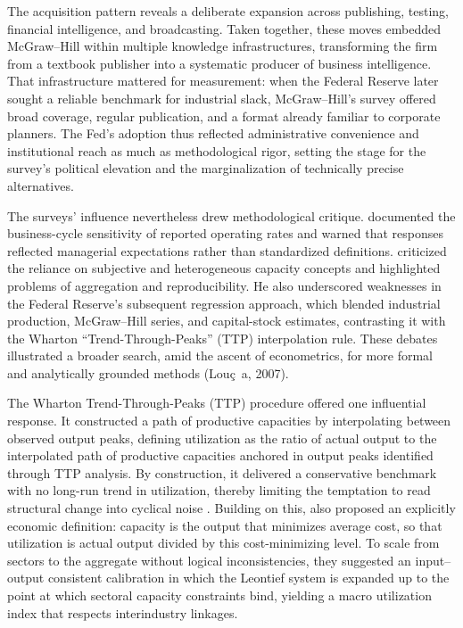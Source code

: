 \documentclass[11pt]{article}
\begin{document}
The acquisition pattern reveals a deliberate expansion across publishing, testing, financial intelligence, and broadcasting. Taken together, these moves embedded McGraw--Hill within multiple knowledge infrastructures, transforming the firm from a textbook publisher into a systematic producer of business intelligence. That infrastructure mattered for measurement: when the Federal Reserve later sought a reliable benchmark for industrial slack, McGraw--Hill's survey offered broad coverage, regular publication, and a format already familiar to corporate planners. The Fed's adoption thus reflected administrative convenience and institutional reach as much as methodological rigor, setting the stage for the survey's political elevation and the marginalization of technically precise alternatives.

The surveys' influence nevertheless drew methodological critique. \citet{butler1958} documented the business-cycle sensitivity of reported operating rates and warned that responses reflected managerial expectations rather than standardized definitions. \citet{phillips1963} criticized the reliance on subjective and heterogeneous capacity concepts and highlighted problems of aggregation and reproducibility. He also underscored weaknesses in the Federal Reserve's subsequent regression approach, which blended industrial production, McGraw--Hill series, and capital-stock estimates, contrasting it with the Wharton ``Trend-Through-Peaks'' (TTP) interpolation rule. These debates illustrated a broader search, amid the ascent of econometrics, for more formal and analytically grounded methods (Lou{\c{c}}{~a}, 2007).

The Wharton Trend-Through-Peaks (TTP) procedure offered one influential response. It constructed a path of productive capacities by interpolating between observed output peaks, defining utilization as the ratio of actual output to the interpolated path of productive capacities anchored in output peaks identified through TTP analysis. By construction, it delivered a conservative benchmark with no long-run trend in utilization, thereby limiting the temptation to read structural change into cyclical noise \citep{kleinsummers1967}. Building on this, \citet{kleindavid1958} also proposed an explicitly economic definition: capacity is the output that minimizes average cost, so that utilization is actual output divided by this cost-minimizing level. To scale from sectors to the aggregate without logical inconsistencies, they suggested an input--output consistent calibration in which the Leontief system is expanded up to the point at which sectoral capacity constraints bind, yielding a macro utilization index that respects interindustry linkages.
\end{document}
